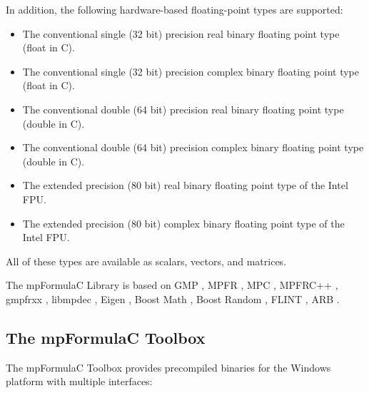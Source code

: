 In addition, the following hardware-based floating-point types are supported:

\begin{itemize}		
	\item The conventional single (32 bit) precision real binary floating point type (float in C).
	\item The conventional single (32 bit) precision complex binary floating point type (float in C).	
	\item The conventional double (64 bit) precision real binary floating point type (double in C).
	\item The conventional double (64 bit) precision complex binary floating point type (double in C).	
	\item The extended precision (80 bit) real binary floating point type of the Intel FPU.
	\item The extended precision (80 bit) complex binary floating point type of the Intel FPU.	
\end{itemize}


All of these types are available as scalars, vectors, and matrices.

\vpara
The mpFormulaC Library is based on GMP \citep{Granlund12}, MPFR \citep{MPFR_2007}, MPC \citep{mpc_2012}, MPFRC++ \citep{Holoborodko2012}, gmpfrxx \citep{Wilkening2008}, libmpdec \citep{mpd_2012}, Eigen \citep{Guennebaud2010}, Boost Math \citep{boost_math}, Boost Random \citep{boost_random}, FLINT \cite{Hart2010}, ARB \cite{arb}.


	
\subsection{The mpFormulaC Toolbox}	
The mpFormulaC Toolbox provides precompiled binaries for the Windows platform with multiple interfaces:

